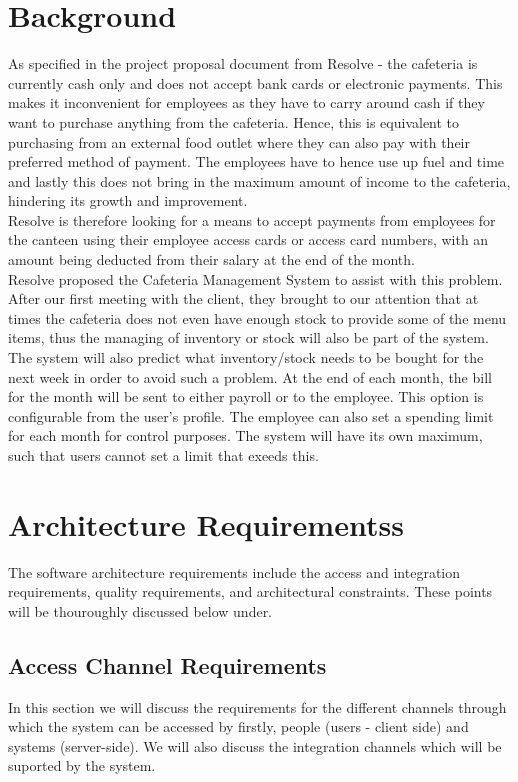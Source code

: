 \documentclass[12pt]{article}
\begin{document}
\section{Background}
As specified in the project proposal document from Resolve - the cafeteria is currently cash only and does not accept bank cards or electronic payments. This makes it inconvenient for employees as they have to carry around cash if they want to purchase anything from the cafeteria. Hence, this is equivalent to purchasing from an external food outlet where they can also pay with their preferred method of payment. The employees have to hence use up fuel and time and lastly this does not bring in the maximum amount of income to the cafeteria, hindering its growth and improvement.\\

Resolve is therefore looking for a means to accept payments from employees for the canteen using their employee access cards or access card numbers, with an amount being deducted from their salary at the end of the month.\\

Resolve proposed the Cafeteria Management System to assist with this problem.
After our first meeting with the client, they brought to our attention that at times the cafeteria does not even have enough stock to provide some of the menu items, thus the managing of inventory or stock will also be part of the system. The system will also predict what inventory/stock needs to be bought for the next week in order to avoid such a problem. At the end of each month, the bill for the month will be sent to either payroll or to the employee. This option is configurable from the user's profile. The employee can also set a spending limit for each month for control purposes. The system will have its own maximum, such that users cannot set a limit that exeeds this. 

\section{Architecture Requirementss}
The software architecture requirements include the access and integration requirements, quality
requirements, and architectural constraints. These points will be thouroughly discussed below under.

\subsection{Access Channel Requirements}
In this section we will discuss the requirements for the different channels through which the system can be accessed by firstly, people (users - client side) and systems (server-side). We will also discuss the integration channels which will be suported by the system.
\end{document}
